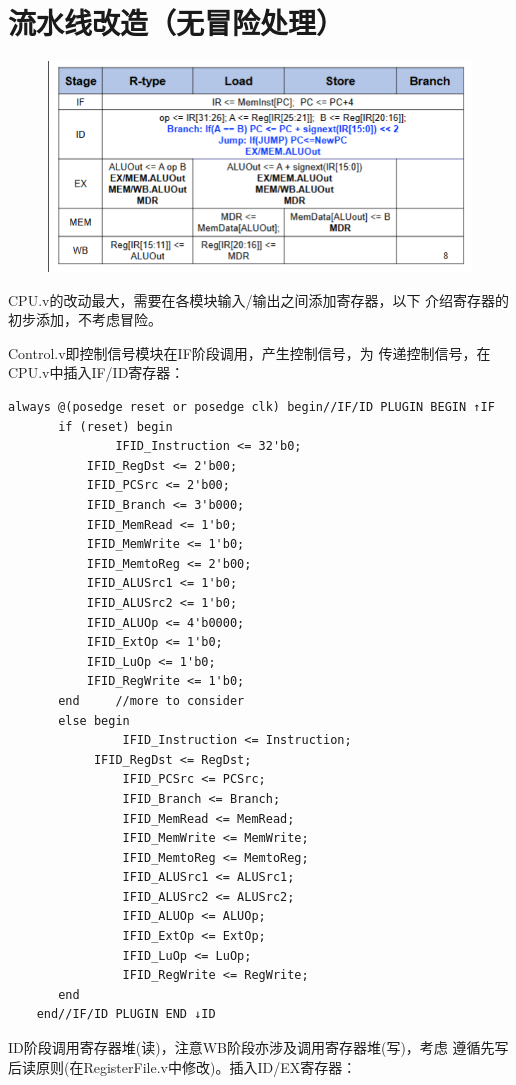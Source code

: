\documentclass[10pt]{article}
\begin{document}
\section{流水线改造（无冒险处理）}
\begin{figure}[H]
    \centering
    \includegraphics[scale=0.75]{table.png}
    \end{figure}
CPU.v的改动最大，需要在各模块输入/输出之间添加寄存器，以下
介绍寄存器的初步添加，不考虑冒险。

Control.v即控制信号模块在IF阶段调用，产生控制信号，为
传递控制信号，在CPU.v中插入IF/ID寄存器：
\begin{lstlisting}[style={verilog-style}]
	always @(posedge reset or posedge clk) begin//IF/ID PLUGIN BEGIN ↑IF
	   if (reset) begin
               IFID_Instruction <= 32'b0;
	       IFID_RegDst <= 2'b00;
	       IFID_PCSrc <= 2'b00;
	       IFID_Branch <= 3'b000;
	       IFID_MemRead <= 1'b0;
	       IFID_MemWrite <= 1'b0;
	       IFID_MemtoReg <= 2'b00;
	       IFID_ALUSrc1 <= 1'b0;
	       IFID_ALUSrc2 <= 1'b0;
	       IFID_ALUOp <= 4'b0000;
	       IFID_ExtOp <= 1'b0;
	       IFID_LuOp <= 1'b0;
	       IFID_RegWrite <= 1'b0;
	   end	   //more to consider
	   else begin
                IFID_Instruction <= Instruction;
	        IFID_RegDst <= RegDst;
                IFID_PCSrc <= PCSrc;
                IFID_Branch <= Branch;
                IFID_MemRead <= MemRead;
                IFID_MemWrite <= MemWrite;
                IFID_MemtoReg <= MemtoReg;
                IFID_ALUSrc1 <= ALUSrc1;
                IFID_ALUSrc2 <= ALUSrc2;
                IFID_ALUOp <= ALUOp;
                IFID_ExtOp <= ExtOp;
                IFID_LuOp <= LuOp;
                IFID_RegWrite <= RegWrite;
	   end
	end//IF/ID PLUGIN END ↓ID
\end{lstlisting}

ID阶段调用寄存器堆(读)，注意WB阶段亦涉及调用寄存器堆(写)，考虑
遵循先写后读原则(在RegisterFile.v中修改)。插入ID/EX寄存器：
\begin{lstlisting}[style={verilog-style}]

\end{lstlisting}
\end{document}
